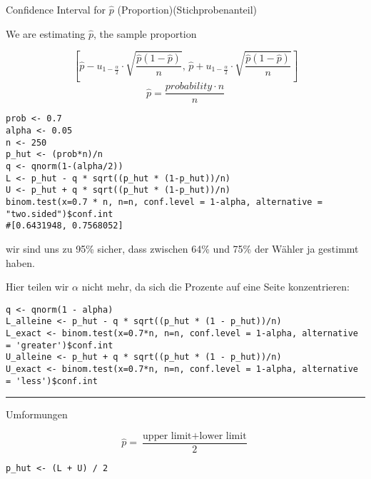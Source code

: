 \begin{multicols*}{2}

\begin{center}
     \Large{Confidence Interval for $\hat{p}$ (Proportion)(Stichprobenanteil)}
\end{center}

\begin{center}
     \Large{We are estimating $\hat{p}$, the sample proportion}
\end{center}

\[
\left[ \hat{p} - u_{1 - \frac{\alpha}{2}} \cdot \sqrt{\frac{\hat{p}(1 - \hat{p})}{n}}, \, \hat{p} + u_{1 - \frac{\alpha}{2}} \cdot \sqrt{\frac{\hat{p}(1 - \hat{p})}{n}} \right]
\]
$$\hat{p} = \frac{probability \cdot n}{n}$$

\begin{lstlisting}
prob <- 0.7
alpha <- 0.05
n <- 250
p_hut <- (prob*n)/n
q <- qnorm(1-(alpha/2))
L <- p_hut - q * sqrt((p_hut * (1-p_hut))/n)
U <- p_hut + q * sqrt((p_hut * (1-p_hut))/n)
binom.test(x=0.7 * n, n=n, conf.level = 1-alpha, alternative = "two.sided")$conf.int
#[0.6431948, 0.7568052]
\end{lstlisting}
wir sind uns zu 95\% sicher, dass zwischen 64\% und 75\% der Wähler ja gestimmt haben.
\bigbreak


Hier teilen wir $\alpha$ nicht mehr, da sich die Prozente auf eine Seite konzentrieren:

\begin{lstlisting}
q <- qnorm(1 - alpha)
L_alleine <- p_hut - q * sqrt((p_hut * (1 - p_hut))/n)
L_exact <- binom.test(x=0.7*n, n=n, conf.level = 1-alpha, alternative = 'greater')$conf.int
U_alleine <- p_hut + q * sqrt((p_hut * (1 - p_hut))/n)
U_exact <- binom.test(x=0.7*n, n=n, conf.level = 1-alpha, alternative = 'less')$conf.int

\end{lstlisting}

\hrule

\begin{center}
     \Large{Umformungen}
\end{center}

\[
\hat{p} = \frac{\text{upper limit} + \text{lower limit}}{2}
\]

\begin{lstlisting}
p_hut <- (L + U) / 2
\end{lstlisting}
\bigbreak
{}


\end{multicols*}
